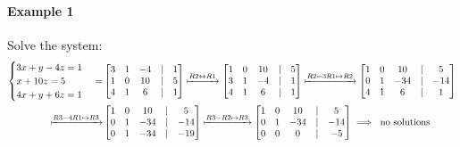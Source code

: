 \paragraph*{Example 1} Solve the system:
\begin{align*}
    \begin{cases}
        3x + y - 4z = 1 \\
        x + 10z = 5 \\
        4x + y + 6z = 1 \\
    \end{cases} = &\begin{bmatrix}
        3 & 1 & -4 & | & 1 \\
        1 & 0 & 10 & | & 5 \\
        4 & 1 & 6 & | & 1 \\
    \end{bmatrix} \xmapsto{R2 \leftrightarrow R1} \begin{bmatrix}
        1 & 0 & 10 & | & 5 \\
        3 & 1 & -4 & | & 1 \\
        4 & 1 & 6 & | & 1 \\
    \end{bmatrix} \xmapsto{R2 - 3R1 \mapsto R2} \begin{bmatrix}
        1 & 0 & 10 & | & 5 \\
        0 & 1 & -34 & | & -14 \\
        4 & 1 & 6 & | & 1 \\
    \end{bmatrix}\\ 
    \xmapsto{R3 - 4R1 \mapsto R3} &\begin{bmatrix}
        1 & 0 & 10 & | & 5 \\
        0 & 1 & -34 & | & -14 \\
        0 & 1 & -34 & | & -19 \\
    \end{bmatrix} 
    \xmapsto{R3 - R2 \mapsto R3} \begin{bmatrix}
       1 & 0 & 10 & | & 5 \\
        0 & 1 & -34 & | & -14 \\
        0 & 0 & 0 & | & -5 \\
    \end{bmatrix} \implies \text{ no solutions}
\end{align*}

